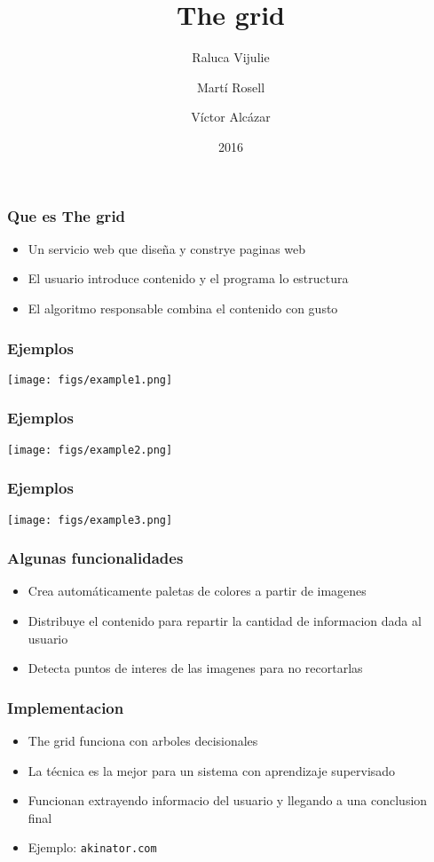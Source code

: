 \documentclass{beamer}
\title{The grid}
\author{Raluca Vijulie \and Martí Rosell \and Víctor Alcázar}
\institute{Inteligencia Artificial}
\date{2016}
\begin{document}
\frame{\titlepage}


\begin{frame}

\frametitle{Que es The grid}
\begin{itemize}
  \item<1-> Un servicio web que diseña y constrye paginas web
  \item<2-> El usuario introduce contenido y el programa lo estructura
  \item<3-> El algoritmo responsable combina el contenido con gusto
\end{itemize}

\end{frame}

\begin{frame}
  \frametitle{Ejemplos}
  \texttt{[image: figs/example1.png]}
\end{frame}

\begin{frame}
  \frametitle{Ejemplos}
  \texttt{[image: figs/example2.png]}
\end{frame}

\begin{frame}
  \frametitle{Ejemplos}
  \texttt{[image: figs/example3.png]}
\end{frame}

\begin{frame}

  \frametitle{Algunas funcionalidades}
  \begin{itemize}
    \item<1-> Crea automáticamente paletas de colores a partir de imagenes
    \item<2-> Distribuye el contenido para repartir la cantidad de 
      informacion dada al usuario
    \item<3-> Detecta puntos de interes de las imagenes para no 
      recortarlas
  \end{itemize}

\end{frame}

\begin{frame}
  \frametitle{Implementacion}
    \begin{itemize}
      \item<1-> The grid funciona con arboles decisionales
      \item<2-> La técnica es la mejor para un sistema con aprendizaje 
        supervisado
      \item<3-> Funcionan extrayendo informacio del usuario y llegando a 
        una conclusion final
      \item<4-> Ejemplo: \texttt{akinator.com}
    \end{itemize}
\end{frame}
\end{document}
